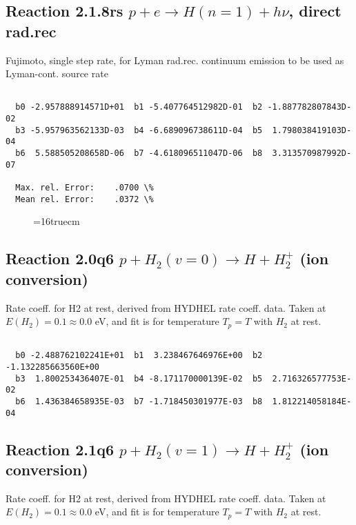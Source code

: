 \documentclass[12pt,dvipdfmx]{article}
\begin{document}
\subsection{
Reaction 2.1.8rs
 $ p + e \rightarrow H(n=1) + h\nu$, direct rad.rec
}
Fujimoto, single step rate, for Lyman rad.rec. continuum emission
to be used as Lyman-cont. source rate

\begin{small}\begin{verbatim}

  b0 -2.957888914571D+01  b1 -5.407764512982D-01  b2 -1.887782807843D-02
  b3 -5.957963562133D-03  b4 -6.689096738611D-04  b5  1.798038419103D-04
  b6  5.588505208658D-06  b7 -4.618096511047D-06  b8  3.313570987992D-07

  Max. rel. Error:    .0700 \%
  Mean rel. Error:    .0372 \%

\end{verbatim}\end{small}
\begin{figure} \label{2.1.8rs}
\epsfxsize=16truecm
\end{figure}
\subsection{
Reaction 2.0q6
$ p + H_2(v=0) \rightarrow H + H_2^+$ (ion conversion)
}
Rate coeff. for H2 at rest, derived from HYDHEL rate coeff. data.
Taken at $E(H_2) = 0.1 \approx 0.0$ eV,  and fit is for temperature $T_p=T$ with $H_2$ at rest.

\begin{small}\begin{verbatim}

  b0 -2.488762102241E+01  b1  3.238467646976E+00  b2 -1.132285663560E+00
  b3  1.800253436407E-01  b4 -8.171170000139E-02  b5  2.716326577753E-02
  b6  1.436384658935E-03  b7 -1.718450301977E-03  b8  1.812214058184E-04

\end{verbatim}\end{small}

\newpage
\subsection{
Reaction 2.1q6
$ p + H_2(v=1) \rightarrow H + H_2^+$ (ion conversion)
}
Rate coeff. for H2 at rest, derived from HYDHEL rate coeff. data.
Taken at $E(H_2) = 0.1 \approx 0.0$ eV,  and fit is for temperature $T_p=T$ with $H_2$ at rest.
\end{document}

